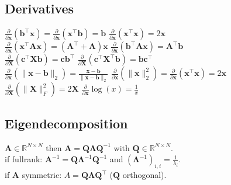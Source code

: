 \subsection*{Derivatives}
$\frac{\partial}{\partial \mathbf{x}}(\mathbf{b}^\top \mathbf{x}) = \frac{\partial}{\partial \mathbf{x}}(\mathbf{x}^\top \mathbf{b}) = \mathbf{b}$ \quad
$\frac{\partial}{\partial \mathbf{x}}(\mathbf{x}^\top \mathbf{x}) = 2\mathbf{x}$\\
$\frac{\partial}{\partial \mathbf{x}}(\mathbf{x}^\top \mathbf{A}\mathbf{x}) = (\mathbf{A}^\top + \mathbf{A})\mathbf{x}$ \quad
$\frac{\partial}{\partial \mathbf{x}}(\mathbf{b}^\top \mathbf{A}\mathbf{x}) = \mathbf{A}^\top \mathbf{b}$\\
$\frac{\partial}{\partial \mathbf{X}}(\mathbf{c}^\top \mathbf{X} \mathbf{b}) = \mathbf{c}\mathbf{b}^\top$ \quad
$\frac{\partial}{\partial \mathbf{X}}(\mathbf{c}^\top \mathbf{X}^\top \mathbf{b}) = \mathbf{b}\mathbf{c}^\top$\\
$\frac{\partial}{\partial \mathbf{x}}(\| \mathbf{x}-\mathbf{b} \|_2) = \frac{\mathbf{x}-\mathbf{b}}{\|\mathbf{x}-\mathbf{b}\|_2}$ \quad
$\frac{\partial}{\partial \mathbf{x}}(\|\mathbf{x}\|^2_2) = \frac{\partial}{\partial \mathbf{x}} (\mathbf{x}^\top \mathbf{x}) = 2\mathbf{x}$\\
$\frac{\partial}{\partial \mathbf{X}}(\|\mathbf{X}\|_F^2) = 2\mathbf{X}$ \quad
$\frac{\partial}{\partial \mathbf{x}}\log(x) = \frac{1}{x}$

\subsection*{Eigendecomposition}
$\mathbf{A} \in \mathbb{R}^{N \times N}$ then $\mathbf{A} = \mathbf{Q} \boldsymbol{\Lambda} \mathbf{Q}^{-1}$ with $\mathbf{Q} \in \mathbb{R}^{N \times N}$.\\
if fullrank: $\mathbf{A}^{-1} = \mathbf{Q} \boldsymbol{\Lambda}^{-1} \mathbf{Q}^{-1}$ and $(\boldsymbol{\Lambda}^{-1})_{i,i} = \frac{1}{\lambda_i}$.\\
if $\mathbf{A}$ symmetric: $A = \mathbf{Q} \boldsymbol{\Lambda} \mathbf{Q^\top}$ ($\mathbf{Q}$ orthogonal).

